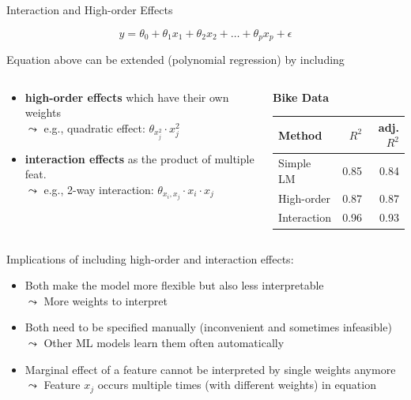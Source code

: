 \documentclass[11pt,compress,t,notes=noshow, aspectratio=169, xcolor=table]{beamer}
\begin{document}
\begin{frame}{Interaction and High-order Effects}

$$y = \theta_0 + \theta_1 x_1 + \theta_2 x_2 + \dots + \theta_p x_p + \epsilon$$

Equation above can be extended (polynomial regression) by including

\begin{columns}[T, totalwidth=\linewidth]
\begin{column}{0.65\linewidth}
    \begin{itemize}
        \item \textbf{high-order effects} which have their own weights\\
        $\leadsto$ e.g., quadratic effect: $\theta_{x_j^2} \cdot x_j^2$
        \item \textbf{interaction effects} as the product of multiple feat.\\
        $\leadsto$ e.g., 2-way interaction: $\theta_{x_i, x_j} \cdot x_i \cdot x_j$
    \end{itemize}
\end{column}
\begin{column}{0.34\linewidth}
    \vspace{-0.2cm}
    \centering
    \begin{scriptsize}
    \begin{table}[ht]
    \textbf{Bike Data}
        \begin{tabular}{lrr}
        \hline
        Method & $R^2$ & adj. $R^2$ \\ 
        \hline
        Simple LM & 0.85 & 0.84 \\ 
        High-order & 0.87 & 0.87 \\ 
        Interaction  & 0.96 & 0.93 \\ 
        \hline
        \end{tabular}
    \end{table}
    \end{scriptsize}
\end{column}
\end{columns}

\pause
Implications of including high-order and interaction effects: 
\begin{itemize}
    \item Both make the model more flexible but also less interpretable\\
    $\leadsto$ More weights to interpret
    \item Both need to be specified manually (inconvenient and sometimes infeasible)\\
    $\leadsto$ Other ML models learn them often automatically
    \item Marginal effect of a feature cannot be interpreted by single weights anymore\\
$\leadsto$ Feature $x_j$ occurs multiple times (with different weights) in equation
\end{itemize}


\end{frame}
\end{document}
